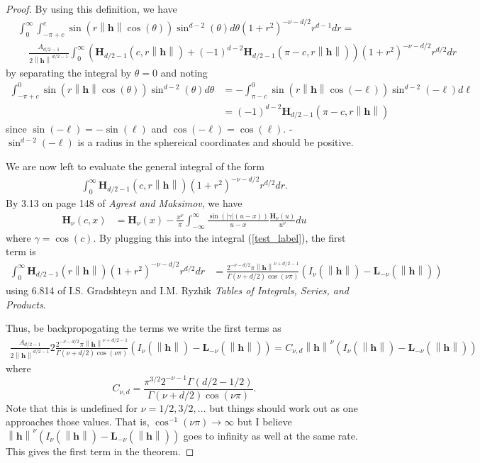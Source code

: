 \documentclass[11pt]{article}
\newcommand{\hh}{\left\lVert \boldsymbol{h}\right\rVert}
\begin{document}
\begin{proof}
By using this definition, we have \begin{align*}
&\int_0^\infty \int_{-\pi+c}^c \sin(r\hh\cos(\theta))\sin^{d-2}(\theta) d\theta(1+ r^2)^{-\nu-d/2} r^{d-1} dr = \\
&\ \ \ \ \ \frac{A_{d/2-1}}{2\hh^{d/2-1}}\int_0^\infty (\boldsymbol{H}_{d/2 - 1}(c,r\hh) + (-1)^{d-2} \boldsymbol{H}_{d/2 - 1}(\pi-c, r\hh))  (1+ r^2)^{-\nu-d/2} r^{d/2}dr
\end{align*}by separating the integral by $\theta = 0$ and noting \begin{align*}
\int_{-\pi+c}^0 \sin(r\hh\cos(\theta)) \sin^{d-2}(\theta) d\theta &= -\int_{\pi-c}^0 \sin(r\hh\cos(-\ell))\sin^{d-2}(-\ell) d\ell \\
&=(-1)^{d-2} \boldsymbol{H}_{d/2-1}(\pi- c, r\hh) 
\end{align*}since $\sin(-\ell) = -\sin(\ell)$ and $\cos(-\ell) = \cos(\ell)$.  - $\sin^{d-2}(-\ell)$ is a radius in the sphereical coordinates and should be positive.

We are now left to evaluate the general integral of the form \begin{align}
\int_0^\infty \boldsymbol{H}_{d/2 - 1}(c,r\hh) (1+ r^2)^{-\nu-d/2} r^{d/2}dr.\label{test_label}
\end{align}By 3.13 on page 148 of \textit{Agrest and Maksimov}, we have \begin{align}
  \boldsymbol{H}_\nu(c, x) &= \boldsymbol{H}_\nu(x) - \frac{x^\nu}{\pi} \int_{-\infty}^\infty \frac{\sin(|\gamma|(u-x))}{u-x}\frac{\boldsymbol{H}_\nu(u)}{u^\nu} du\label{incomplete_complete}
\end{align}where $\gamma = \cos(c)$. By plugging this into the integral (\ref{test_label}), the first term is \begin{align*}
\int_0^\infty \boldsymbol{H}_{d/2 - 1}(r\hh) (1+ r^2)^{-\nu-d/2} r^{d/2}dr &= \frac{2^{-\nu - d/2}\pi \hh^{\nu+d/2-1}}{\Gamma(\nu + d/2)\cos(\nu\pi)}\left(I_{\nu}(\hh) - \boldsymbol{L}_{-\nu}(\hh)\right)
\end{align*}using 6.814 of I.S. Gradshteyn and I.M. Ryzhik \textit{Tables of Integrals, Series, and Products}. 

Thus, be backpropogating the terms we write the first terms as \begin{align*}
\frac{A_{d/2-1}}{2\hh^{d/2-1}}2\frac{2^{-\nu - d/2}\pi \hh^{\nu+d/2-1}}{\Gamma(\nu + d/2)\cos(\nu\pi)}\left(I_{\nu}(\hh) - \boldsymbol{L}_{-\nu}(\hh)\right)=C_{\nu,d}\hh^{\nu}\left(I_{\nu}(\hh) - \boldsymbol{L}_{-\nu}(\hh)\right)
\end{align*}where $$C_{\nu,d} = \frac{\pi^{3/2}2^{-\nu - 1}\Gamma(d/2 - 1/2)}{\Gamma(\nu + d/2) \cos(\nu\pi)}.$$Note that this is undefined for $\nu = 1/2, 3/2, \dots$ but things should work out as one approaches those values. That is, $\cos^{-1}(\nu\pi) \to \infty$ but I believe $\hh^\nu(I_{\nu}(\hh) - \boldsymbol{L}_{-\nu}(\hh))$ goes to infinity as well at the same rate. This gives the first term in the theorem.


\end{proof}
\end{document}

